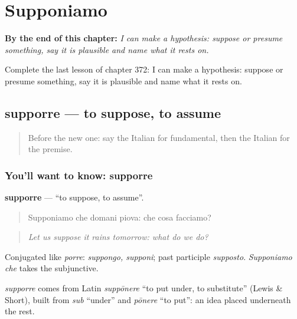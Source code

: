 
\chapter{Supponiamo}
\label{ch:it-supponiamo}

\begin{chapteropening}
\textbf{By the end of this chapter:} \emph{I can make a hypothesis: suppose or presume something, say it is plausible and name what it rests on.}

Complete the last lesson of chapter 372: I can make a hypothesis: suppose or presume something, say it is plausible and name what it rests on.
\end{chapteropening}

\section[supporre]{supporre — to suppose, to assume}

\label{lesson:IT-C372-supporre}



\begin{quote}
Before the new one: say the Italian for fundamental, then the Italian for the premise.
\end{quote}

\subsection*{You'll want to know: supporre}
\textbf{supporre} — \textquotedblleft{}to suppose, to assume\textquotedblright{}.

\begin{quote}
Supponiamo che domani piova: che cosa facciamo?
\end{quote}

\begin{quote}
\emph{Let us suppose it rains tomorrow: what do we do?}
\end{quote}

Conjugated like \emph{porre}: \emph{suppongo, supponi}; past participle \emph{supposto}. \emph{Supponiamo che} takes the subjunctive.

\begin{cousinweb}
\emph{supporre} comes from Latin \emph{suppōnere} \textquotedblleft{}to put under, to substitute\textquotedblright{} (Lewis \& Short), built from \emph{sub} \textquotedblleft{}under\textquotedblright{} and \emph{pōnere} \textquotedblleft{}to put\textquotedblright{}: an idea placed underneath the rest.
\end{cousinweb}

